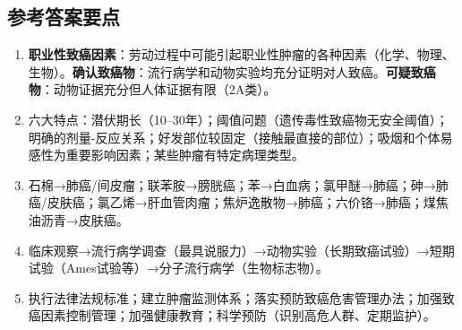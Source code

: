 \subsection*{参考答案要点}

\begin{enumerate}[leftmargin=*]
    \item \textbf{职业性致癌因素}：劳动过程中可能引起职业性肿瘤的各种因素（化学、物理、生物）。\textbf{确认致癌物}：流行病学和动物实验均充分证明对人致癌。\textbf{可疑致癌物}：动物证据充分但人体证据有限（2A类）。
    \item 六大特点：潜伏期长（10--30年）；阈值问题（遗传毒性致癌物无安全阈值）；明确的剂量-反应关系；好发部位较固定（接触最直接的部位）；吸烟和个体易感性为重要影响因素；某些肿瘤有特定病理类型。
    \item 石棉→肺癌/间皮瘤；联苯胺→膀胱癌；苯→白血病；氯甲醚→肺癌；砷→肺癌/皮肤癌；氯乙烯→肝血管肉瘤；焦炉逸散物→肺癌；六价铬→肺癌；煤焦油沥青→皮肤癌。
    \item 临床观察→流行病学调查（最具说服力）→动物实验（长期致癌试验）→短期试验（Ames试验等）→分子流行病学（生物标志物）。
    \item 执行法律法规标准；建立肿瘤监测体系；落实预防致癌危害管理办法；加强致癌因素控制管理；加强健康教育；科学预防（识别高危人群、定期监护）。
\end{enumerate}

\newpage

\newpage